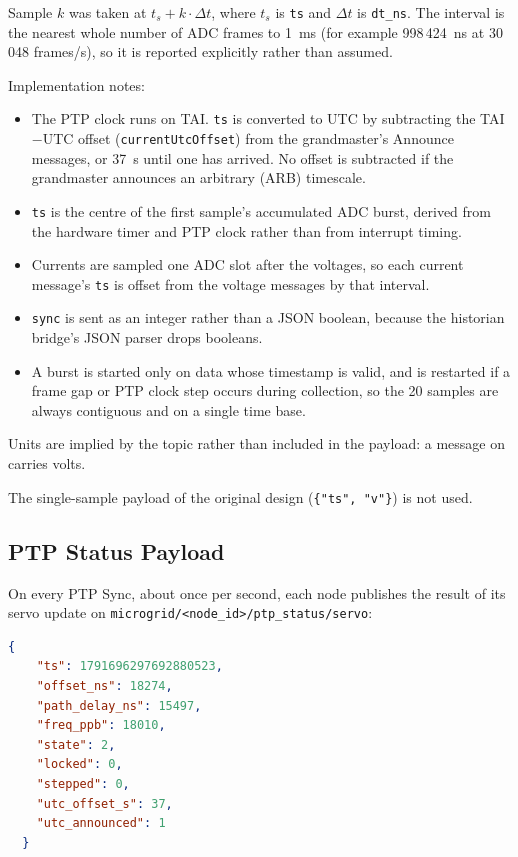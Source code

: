 Sample $k$ was taken at $t_s + k \cdot \Delta t$, where $t_s$ is \texttt{ts} and $\Delta t$ is \texttt{dt\_ns}. The interval is the nearest whole number of ADC frames to 1~ms (for example 998\,424~ns at 30\,048 frames/s), so it is reported explicitly rather than assumed.

Implementation notes:
\begin{itemize}[noitemsep]
  \item The PTP clock runs on TAI. \texttt{ts} is converted to UTC by subtracting the TAI$-$UTC offset (\texttt{currentUtcOffset}) from the grandmaster's Announce messages, or 37~s until one has arrived. No offset is subtracted if the grandmaster announces an arbitrary (ARB) timescale.
  \item \texttt{ts} is the centre of the first sample's accumulated ADC burst, derived from the hardware timer and PTP clock rather than from interrupt timing.
  \item Currents are sampled one ADC slot after the voltages, so each current message's \texttt{ts} is offset from the voltage messages by that interval.
  \item \texttt{sync} is sent as an integer rather than a JSON boolean, because the historian bridge's JSON parser drops booleans.
  \item A burst is started only on data whose timestamp is valid, and is restarted if a frame gap or PTP clock step occurs during collection, so the 20 samples are always contiguous and on a single time base.
\end{itemize}

Units are implied by the topic rather than included in the payload: a message on  carries volts.

The single-sample payload of the original design (\texttt{\{"ts", "v"\}}) is not used.

\subsection{PTP Status Payload}
\label{sec:ptpstatus}
On every PTP Sync, about once per second, each node publishes the result of its servo update on \texttt{microgrid/<node\_id>/ptp\_status/servo}:

\begin{lstlisting}[language=json]
  {
    "ts": 1791696297692880523,
    "offset_ns": 18274,
    "path_delay_ns": 15497,
    "freq_ppb": 18010,
    "state": 2,
    "locked": 0,
    "stepped": 0,
    "utc_offset_s": 37,
    "utc_announced": 1
  }
\end{lstlisting}

